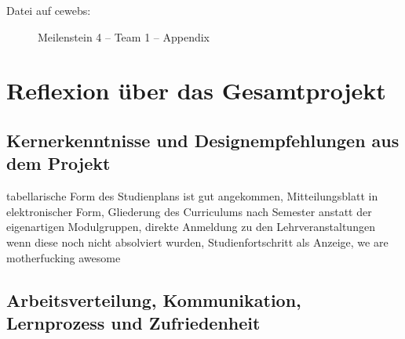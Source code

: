 \documentclass[a4paper,10pt]{scrartcl}
\begin{document}
\begin{description}
 \item[Datei auf cewebs:] Meilenstein 4 -- Team 1 -- Appendix
\end{description}

\section{Reflexion über das Gesamtprojekt}

\subsection{Kernerkenntnisse und Designempfehlungen aus dem Projekt}

% 

tabellarische Form des Studienplans ist gut angekommen, Mitteilungsblatt in elektronischer Form, Gliederung des Curriculums nach Semester anstatt der eigenartigen
Modulgruppen, direkte Anmeldung zu den Lehrveranstaltungen wenn diese noch nicht absolviert wurden, Studienfortschritt als Anzeige, we are motherfucking awesome

\subsection{Arbeitsverteilung, Kommunikation, Lernprozess und Zufriedenheit}


\end{document}
